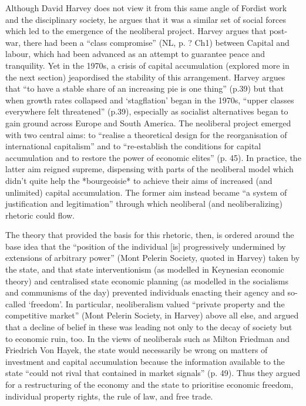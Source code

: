 Although David Harvey does not view it from this same angle of Fordist
work and the disciplinary society, he argues that it was a similar set
of social forces which led to the emergence of the neoliberal project.
Harvey argues that post-war, there had been a ``class compromise'' (NL,
p. ? Ch1) between Capital and labour, which had been advanced as an
attempt to guarantee peace and tranquility. Yet in the 1970s, a crisis
of capital accumulation (explored more in the next section) jeapordised
the stability of this arrangement. Harvey argues that ``to have a stable
share of an increasing pie is one thing'' (p.39) but that when growth
rates collapsed and `stagflation' began in the 1970s, ``upper classes
everywhere felt threatened'' (p.39), especially as socialist
alternatives began to gain ground across Europe and South America. The
neoliberal project emerged with two central aims: to ``realise a
theoretical design for the reorganisation of international capitalism''
and to ``re-establish the conditions for capital accumulation and to
restore the power of economic elites'' (p. 45). In practice, the latter
aim reigned supreme, dispensing with parts of the neoliberal model which
didn't quite help the *bourgeoisie* to achieve their aims of increased
(and unlimited) capital accumulation. The former aim instead became ``a
system of justification and legitimation'' through which neoliberal (and
neoliberalizing) rhetoric could flow.

The theory that provided the basis for this rhetoric, then, is ordered
around the base idea that the ``position of the individual {[}is{]}
progressively undermined by extensions of arbitrary power'' (Mont
Pelerin Society, quoted in Harvey) taken by the state, and that state
interventionism (as modelled in Keynesian economic theory) and
centralised state economic planning (as modelled in the socialisms and
communisms of the day) prevented individuals enacting their agency and
so-called `freedom'. In particular, neoliberalism valued ``private
property and the competitive market'' (Mont Pelerin Society, in Harvey)
above all else, and argued that a decline of belief in these was leading
not only to the decay of society but to economic ruin, too. In the views
of neoliberals such as Milton Friedman and Friedrich Von Hayek, the
state would necessarily be wrong on matters of investment and capital
accumulation because the information available to the state ``could not
rival that contained in market signals'' (p. 49). Thus they argued for a
restructuring of the economy and the state to prioritise economic
freedom, individual property rights, the rule of law, and free trade.

